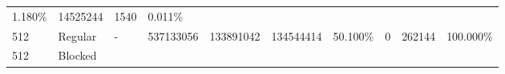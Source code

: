 \documentclass[11pt]{article}
\begin{document}
\begin{longtable}[]{@{}llllllllll@{}}
\begin{minipage}[t]{0.07\columnwidth}
1.180\%\strut
\end{minipage} & \begin{minipage}[t]{0.06\columnwidth}\raggedright\strut
14525244\strut
\end{minipage} & \begin{minipage}[t]{0.07\columnwidth}\raggedright\strut
1540\strut
\end{minipage} & \begin{minipage}[t]{0.07\columnwidth}\raggedright\strut
0.011\%\strut
\end{minipage}\tabularnewline
\begin{minipage}[t]{0.09\columnwidth}\raggedright\strut
512\strut
\end{minipage} & \begin{minipage}[t]{0.06\columnwidth}\raggedright\strut
Regular\strut
\end{minipage} & \begin{minipage}[t]{0.09\columnwidth}\raggedright\strut
-\strut
\end{minipage} & \begin{minipage}[t]{0.07\columnwidth}\raggedright\strut
537133056\strut
\end{minipage} & \begin{minipage}[t]{0.06\columnwidth}\raggedright\strut
133891042\strut
\end{minipage} & \begin{minipage}[t]{0.07\columnwidth}\raggedright\strut
134544414\strut
\end{minipage} & \begin{minipage}[t]{0.07\columnwidth}\raggedright\strut
50.100\%\strut
\end{minipage} & \begin{minipage}[t]{0.06\columnwidth}\raggedright\strut
0\strut
\end{minipage} & \begin{minipage}[t]{0.07\columnwidth}\raggedright\strut
262144\strut
\end{minipage} & \begin{minipage}[t]{0.07\columnwidth}\raggedright\strut
100.000\%\strut
\end{minipage}\tabularnewline
\begin{minipage}[t]{0.09\columnwidth}\raggedright\strut
512\strut
\end{minipage} & \begin{minipage}[t]{0.06\columnwidth}\raggedright\strut
Blocked\strut
\end{minipage} & \begin{minipage}[t]{0.09\columnwidth}\raggedright\strut

\end{minipage}
\end{longtable}
\end{document}
